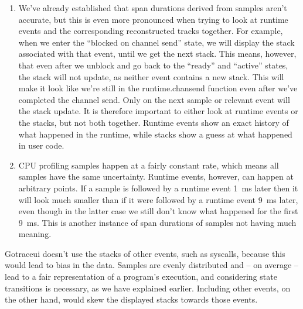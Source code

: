 \documentclass[10pt,letterpaper,oneside,openany,showtrims]{memoir}
\newcommand{\code}[1]{{\ttfamily\mbox{#1}}}
\begin{document}
\begin{enumerate}
\item We've already established that span durations derived from samples aren't accurate, but this is even more
  pronounced when trying to look at runtime events and the corresponding reconstructed tracks together. For
  example, when we enter the \enquote{blocked on channel send} state, we will display the stack associated with that
  event, until we get the next stack. This means, however, that even after we unblock and go back to the
  \enquote{ready} and \enquote{active} states, the stack will not update, as neither event contains a new stack. This
  will make it look like we're still in the \code{runtime.chansend} function even after we've completed the channel
  send. Only on the next sample or relevant event will the stack update. It is therefore important to either look at
  runtime events or the stacks, but not both together. Runtime events show an exact history of what happened in
  the runtime, while stacks show a guess at what happened in user code.

\item CPU profiling samples happen at a fairly constant rate, which means all samples have the same uncertainty.
  Runtime events, however, can happen at arbitrary points. If a sample is followed by a runtime event \unit{1 ms}
  later then it will look much smaller than if it were followed by a runtime event \unit{9 ms} later, even though in
  the latter case we still don't know what happened for the first \unit{9 ms}. This is another instance of span
  durations of samples not having much meaning.
\end{enumerate}

Gotraceui doesn't use the stacks of other events, such as syscalls, because this would lead to bias in the data.
Samples are evenly distributed and – on average – lead to a fair representation of a program's execution, and
considering state transitions is necessary, as we have explained earlier. Including other events, on the other hand,
would skew the displayed stacks towards those events.


\backmatter
\end{document}
